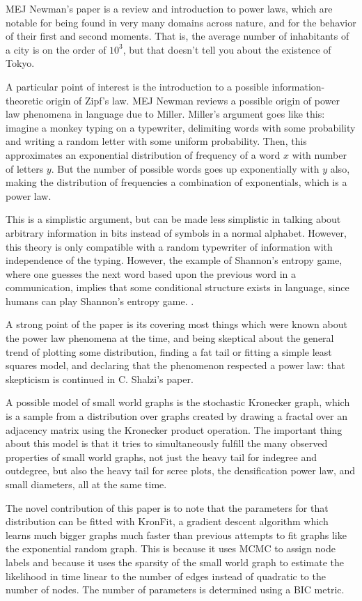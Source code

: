 \documentclass[12pt]{article}
\begin{document}
MEJ Newman's paper is a review and introduction to power laws, which are notable for being found in very many domains across nature, and for the behavior of their first and second moments. That is, the average number of inhabitants of a city is on the order of $10^3$, but that doesn't tell you about the existence of Tokyo.

A particular point of interest is the introduction to a possible information-theoretic origin of Zipf's law. MEJ Newman reviews a possible origin of power law phenomena in language due to Miller\cite{gamiller}. Miller's argument goes like this: imagine a monkey typing on a typewriter, delimiting words with some probability and writing a random letter with some uniform probability. Then, this approximates an exponential distribution of frequency of a word $x$ with number of letters $y$. But the number of possible words goes up exponentially with $y$ also, making the distribution of frequencies a combination of exponentials, which is a power law.

This is a simplistic argument, but can be made less simplistic in talking about arbitrary information in bits instead of symbols in a normal alphabet. However, this theory is only compatible with a random typewriter of information with independence of the typing. However, the example of Shannon's entropy game, where one guesses the next word based upon the previous word in a communication, implies that some conditional structure exists in language, since humans can play Shannon's entropy game. \cite{shannon}
. 

A strong point of the paper is its covering most things which were known about the power law phenomena at the time, and being skeptical about the general trend of plotting some distribution, finding a fat tail or fitting a simple least squares model, and declaring that the phenomenon respected a power law: that skepticism is continued in C. Shalzi's paper\cite{cosma}.

A possible model of small world graphs is the stochastic Kronecker graph\cite{kronfit}, which is a sample from a distribution over graphs created by drawing a fractal over an adjacency matrix using the Kronecker product operation. The important thing about this model is that it tries to simultaneously fulfill the many observed properties of small world graphs, not just the heavy tail for indegree and outdegree, but also the heavy tail for scree plots, the densification power law, and small diameters, all at the same time.

The novel contribution of this paper is to note that the parameters for that distribution can be fitted with KronFit, a gradient descent algorithm which learns much bigger graphs much faster than previous attempts to fit graphs like the exponential random graph. This is because it uses MCMC to assign node labels and because it uses the sparsity of the small world graph to estimate the likelihood in time linear to the number of edges instead of quadratic to the number of nodes. The number of parameters is determined using a BIC metric.
\end{document}
